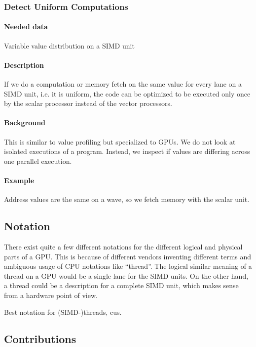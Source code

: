 \subsubsection{Detect Uniform Computations}
\paragraph{Needed data} Variable value distribution on a SIMD unit
\paragraph{Description} If we do a computation or memory fetch on the same value for every lane on a SIMD unit, i.e. it is uniform, the code can be optimized to be executed only once by the scalar processor instead of the vector processors.
\paragraph{Background} This is similar to value profiling but specialized to GPUs. We do not look at isolated executions of a program. Instead, we inspect if values are differing across one parallel execution.
\paragraph{Example} Address values are the same on a wave, so we fetch memory with the scalar unit.

\subsection{Notation}
\label{sub:notation}
There exist quite a few different notations for the different logical and physical parts of a GPU. This is because of different vendors inventing different terms and ambiguous usage of CPU notations like \enquote{thread}. The logical similar meaning of a thread on a GPU would be a single lane for the SIMD units. On the other hand, a thread could be a description for a complete SIMD unit, which makes sense from a hardware point of view.



Best notation for (SIMD-)threads, \glspl{cu}.

\subsection{Contributions}
\label{sub:contributions}
